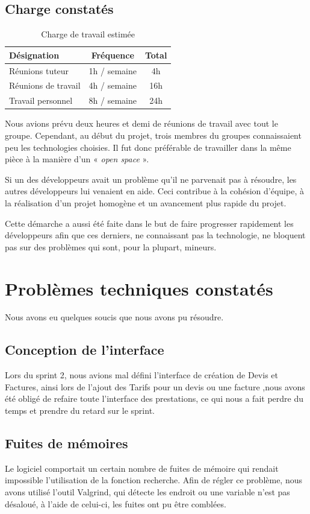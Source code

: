 \documentclass[12pt,a4paper,openany]{article}
\begin{document}
	\subsection{Charge constatés}
	\begin{table}[H]
		\centering
		\begin{tabular}{l|c|c}
			\textbf{Désignation} & \textbf{Fréquence} & \textbf{Total}\\
			\hline
			Réunions tuteur & 1h / semaine & 4h\\
			Réunions de travail & 4h / semaine & 16h\\
			Travail personnel & 8h / semaine & 24h
		\end{tabular}
		\caption{Charge de travail estimée}
	\end{table}
	Nous avions prévu deux heures et demi de réunions de travail avec tout le groupe. Cependant, au début du projet, trois membres du groupes
	connaissaient peu les technologies choisies. Il fut donc préférable de travailler dans la même pièce à la manière d’un « \textit{open space} ». 
	
	Si un des développeurs avait un problème qu'il ne parvenait pas à résoudre, les autres développeurs lui venaient en aide. Ceci contribue à la cohésion
	d'équipe, à la réalisation d’un projet homogène et un avancement plus rapide du projet. 
	
	Cette démarche a aussi été faite dans le but de faire
	progresser rapidement les développeurs afin que ces derniers, ne connaissant pas la technologie, ne bloquent pas sur des problèmes qui sont, pour
	la plupart, mineurs.

	\section{Problèmes techniques constatés}
	Nous avons eu quelques soucis que nous avons pu résoudre.

	\subsection{Conception de l'interface}
	Lors du sprint 2, nous avions mal défini l'interface de création de Devis et Factures, ainsi lors de l'ajout des Tarifs pour un devis ou une
	facture ,nous avons été obligé de refaire toute l'interface des prestations, ce qui nous a fait perdre du temps et prendre du retard sur le
	sprint.

	\subsection{Fuites de mémoires}
	Le logiciel comportait un certain nombre de fuites de mémoire qui rendait impossible l'utilisation de la fonction recherche. Afin de régler ce
	problème, nous avons utilisé l'outil Valgrind, qui détecte les endroit ou une variable n'est pas désaloué, à l'aide de celui-ci, les fuites ont pu
	être comblées.
\end{document}
